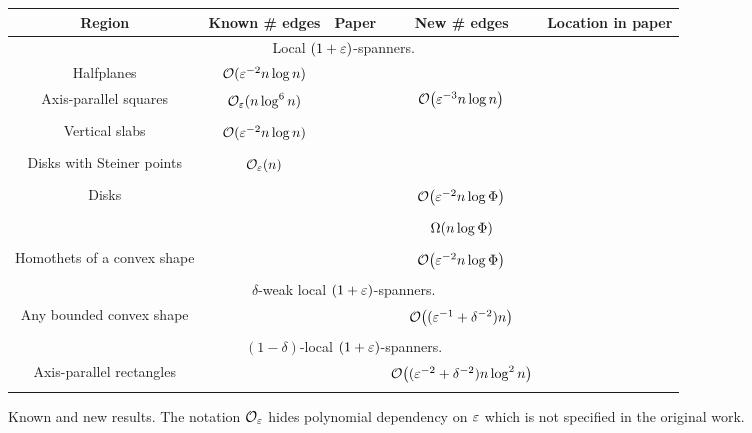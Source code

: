 \documentclass[12pt]{article}%
\begin{document}
	
\begin{figure}
    \centering
    \begin{tabular}{|c|c|c||c|c|}
    	
    	
    	\hline
		Region
		&
		Known \# edges
		&
		Paper
		&
		New \# edges
		&
		Location in paper
		\\
		\hline
		\multicolumn{5}{c}{ Local $(1+\varepsilon)$-spanners$\Bigr.$}
		\\
		\hline
		Halfplanes
		&
		$\mathcal{O}( \varepsilon^{-2} n \log n )\bigr.$
		&
		\cite{abfg-rftgs-09}
		&
		&
		\\
		\hline
		Axis-parallel squares
		&
		$\mathcal{O}_\varepsilon (n \log^6 n) \Bigr.$
		&
		\cite{ab-lgs-21}
		&
		$\Of\pth{\eps^{-3} n \log n}$
		&
		\thmref{l:s:squares}%
		\\
		\hline
		Vertical slabs
		&
		$\mathcal{O} (\varepsilon^{-2} n \log n) \Bigr.$
		&
		\cite{ab-lgs-21}
		&
		&
		\\
		\hline
		Disks with Steiner points
		&
		$\mathcal{O}_\varepsilon (n ) \Bigr.$
		&
		\cite{ab-lgs-21}
		&
		&
		\\
		\hline
		Disks
		&
		&
		&
		$\Of\pth{ \eps^{-2} n\log \spread  }\Bigr.$
		&
		\thmref{main:1}%
		\\
		
		\cline{4-5}
		
		&
		&
		&
		$\Omega(n \log \Phi)\Bigr.$
		&
		\lemref{l:s:lower:bound}%
		\\
		\hline
		Homothets of a convex shape
		&
		&
		&
		$\Of\pth{ \eps^{-2} n\log \spread  }\Bigr.$
		&
		\thmref{l:s:homothets}%
		\\
		\hline
		\multicolumn{5}{c}{$\delta$-weak local $(1+\varepsilon)$-spanners$\Bigr.$}
		\\
		\hline
		Any bounded convex shape
		&
		&
		&
		$\mathcal{O}\bigl( (\varepsilon^{-1} + \delta^{-2}) n \bigr)\Bigr. $
		&
		\lemref{w:l:s:regions}%
		\\
		\hline
		\multicolumn{5}{c}{$(1-\delta)$-local $(1+\varepsilon)$-spanners$\Bigr.$}
		\\
		\hline%
		Axis-parallel rectangles
		&
		&
		&
		$\mathcal{O}\bigl((\varepsilon^{-2} + \delta^{-2}) n \log^2 n \bigr)\Bigr.$ 
		&
		\thmref{a:l:s:rectangles}%
		\\
		\hline
    \end{tabular}
    \caption{Known and new results. The notation $\mathcal{O}_\varepsilon$ hides
       polynomial dependency on $\varepsilon$ which is not specified in the
       original work.}
\end{figure}
\end{document}
